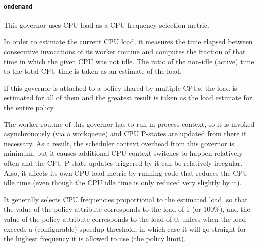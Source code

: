 \documentclass[a4paper,8pt,english]{sphinxmanual}
\begin{document}
\paragraph{\texttt{ondemand}}
\label{admin-guide/pm/cpufreq:ondemand}
This governor uses CPU load as a CPU frequency selection metric.

In order to estimate the current CPU load, it measures the time elapsed between
consecutive invocations of its worker routine and computes the fraction of that
time in which the given CPU was not idle.  The ratio of the non-idle (active)
time to the total CPU time is taken as an estimate of the load.

If this governor is attached to a policy shared by multiple CPUs, the load is
estimated for all of them and the greatest result is taken as the load estimate
for the entire policy.

The worker routine of this governor has to run in process context, so it is
invoked asynchronously (via a workqueue) and CPU P-states are updated from
there if necessary.  As a result, the scheduler context overhead from this
governor is minimum, but it causes additional CPU context switches to happen
relatively often and the CPU P-state updates triggered by it can be relatively
irregular.  Also, it affects its own CPU load metric by running code that
reduces the CPU idle time (even though the CPU idle time is only reduced very
slightly by it).

It generally selects CPU frequencies proportional to the estimated load, so that
the value of the  policy attribute corresponds to the load of
1 (or 100\%), and the value of the  policy attribute
corresponds to the load of 0, unless when the load exceeds a (configurable)
speedup threshold, in which case it will go straight for the highest frequency
it is allowed to use (the  policy limit).
\end{document}
